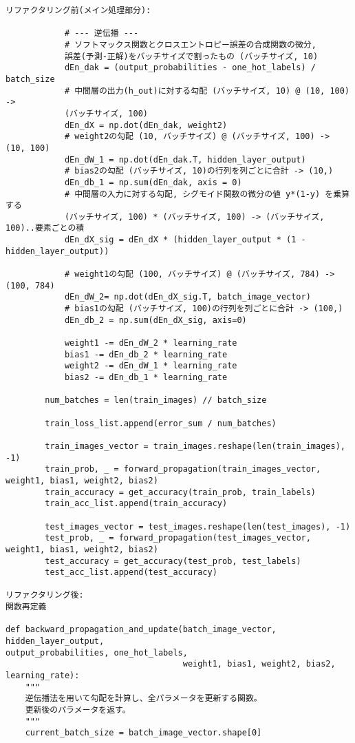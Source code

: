 \documentclass[11px,a4,dvipdfmx]{jsarticle}
\begin{document}
\begin{verbatim}
リファクタリング前(メイン処理部分):
            
            # --- 逆伝播 ---
            # ソフトマックス関数とクロスエントロピー誤差の合成関数の微分, 
            誤差(予測-正解)をバッチサイズで割ったもの (バッチサイズ, 10)
            dEn_dak = (output_probabilities - one_hot_labels) / batch_size
            # 中間層の出力(h_out)に対する勾配 (バッチサイズ, 10) @ (10, 100) -> 
            (バッチサイズ, 100)
            dEn_dX = np.dot(dEn_dak, weight2)
            # weight2の勾配 (10, バッチサイズ) @ (バッチサイズ, 100) -> (10, 100)
            dEn_dW_1 = np.dot(dEn_dak.T, hidden_layer_output)
            # bias2の勾配 (バッチサイズ, 10)の行列を列ごとに合計 -> (10,) 
            dEn_db_1 = np.sum(dEn_dak, axis = 0)
            # 中間層の入力に対する勾配, シグモイド関数の微分の値 y*(1-y) を乗算する 
            (バッチサイズ, 100) * (バッチサイズ, 100) -> (バッチサイズ, 100)..要素ごとの積
            dEn_dX_sig = dEn_dX * (hidden_layer_output * (1 - hidden_layer_output))

            # weight1の勾配 (100, バッチサイズ) @ (バッチサイズ, 784) -> (100, 784)
            dEn_dW_2= np.dot(dEn_dX_sig.T, batch_image_vector)
            # bias1の勾配 (バッチサイズ, 100)の行列を列ごとに合計 -> (100,)
            dEn_db_2 = np.sum(dEn_dX_sig, axis=0)

            weight1 -= dEn_dW_2 * learning_rate 
            bias1 -= dEn_db_2 * learning_rate
            weight2 -= dEn_dW_1 * learning_rate 
            bias2 -= dEn_db_1 * learning_rate

        num_batches = len(train_images) // batch_size
        
        train_loss_list.append(error_sum / num_batches)
        
        train_images_vector = train_images.reshape(len(train_images), -1)
        train_prob, _ = forward_propagation(train_images_vector, weight1, bias1, weight2, bias2)
        train_accuracy = get_accuracy(train_prob, train_labels)
        train_acc_list.append(train_accuracy)
        
        test_images_vector = test_images.reshape(len(test_images), -1)
        test_prob, _ = forward_propagation(test_images_vector, weight1, bias1, weight2, bias2)
        test_accuracy = get_accuracy(test_prob, test_labels)
        test_acc_list.append(test_accuracy)

リファクタリング後:
関数再定義

def backward_propagation_and_update(batch_image_vector, hidden_layer_output, 
output_probabilities, one_hot_labels, 
                                    weight1, bias1, weight2, bias2, learning_rate):
    """
    逆伝播法を用いて勾配を計算し、全パラメータを更新する関数。
    更新後のパラメータを返す。
    """
    current_batch_size = batch_image_vector.shape[0]
    

\end{verbatim}
\end{document}
